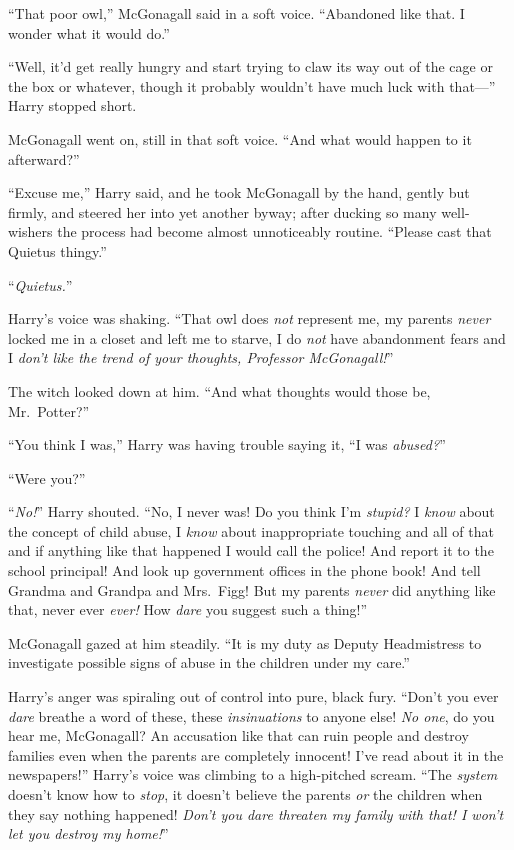 “That poor owl,” McGonagall said in a soft voice. “Abandoned like that. I wonder what it would do.”

“Well, it’d get really hungry and start trying to claw its way out of the cage or the box or whatever, though it probably wouldn’t have much luck with that—” Harry stopped short.

McGonagall went on, still in that soft voice. “And what would happen to it afterward?”

“Excuse me,” Harry said, and he took McGonagall by the hand, gently but firmly, and steered her into yet another byway; after ducking so many well-wishers the process had become almost unnoticeably routine. “Please cast that Quietus thingy.”

“\emph{Quietus.}”

Harry’s voice was shaking. “That owl does \emph{not} represent me, my parents \emph{never} locked me in a closet and left me to starve, I do \emph{not} have abandonment fears and I \emph{don’t like the trend of your thoughts, Professor McGonagall!}”

The witch looked down at him. “And what thoughts would those be, Mr.~Potter?”

“You think I was,” Harry was having trouble saying it, “I was \emph{abused?}”

“Were you?”

“\emph{No!}” Harry shouted. “No, I never was! Do you think I’m \emph{stupid?} I \emph{know} about the concept of child abuse, I \emph{know} about inappropriate touching and all of that and if anything like that happened I would call the police! And report it to the school principal! And look up government offices in the phone book! And tell Grandma and Grandpa and Mrs.~Figg! But my parents \emph{never} did anything like that, never ever \emph{ever!} How \emph{dare} you suggest such a thing!”

McGonagall gazed at him steadily. “It is my duty as Deputy Headmistress to investigate possible signs of abuse in the children under my care.”

Harry’s anger was spiraling out of control into pure, black fury. “Don’t you ever \emph{dare} breathe a word of these, these \emph{insinuations} to anyone else! \emph{No one}, do you hear me, McGonagall? An accusation like that can ruin people and destroy families even when the parents are completely innocent! I’ve read about it in the newspapers!” Harry’s voice was climbing to a high-pitched scream. “The \emph{system} doesn’t know how to \emph{stop}, it doesn’t believe the parents \emph{or} the children when they say nothing happened! \emph{Don’t you dare threaten my family with that! I won’t let you destroy my home!}”

